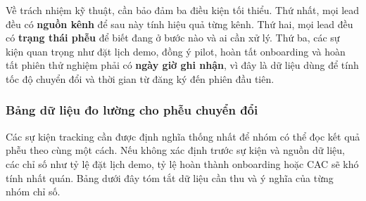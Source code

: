 Về trách nhiệm kỹ thuật, cần bảo đảm ba điều kiện tối thiểu. Thứ nhất, mọi
lead đều có \textbf{nguồn kênh} để sau này tính hiệu quả từng kênh. Thứ hai, mọi
lead đều có \textbf{trạng thái phễu} để biết đang ở bước nào và ai cần xử lý.
Thứ ba, các sự kiện quan trọng như đặt lịch demo, đồng ý pilot, hoàn tất
onboarding và hoàn tất phiên thử nghiệm phải có \textbf{ngày giờ ghi nhận}, vì
đây là dữ liệu dùng để tính tốc độ chuyển đổi và thời gian từ đăng ký đến phiên
đầu tiên.

\subsubsection{Bảng dữ liệu đo lường cho phễu chuyển đổi}

Các sự kiện tracking cần được định nghĩa thống nhất để nhóm có thể đọc kết quả
phễu theo cùng một cách. Nếu không xác định trước sự kiện và nguồn dữ liệu, các
chỉ số như tỷ lệ đặt lịch demo, tỷ lệ hoàn thành onboarding hoặc CAC sẽ khó tính
nhất quán. Bảng dưới đây tóm tắt dữ liệu cần thu và ý nghĩa của từng nhóm chỉ số.

